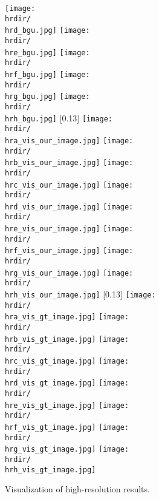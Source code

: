 \documentclass[runningheads]{llncs}
\begin{document}
\begin{figure*}[hthb]
{\texttt{[image: \\hrdir/\\hrd\_bgu.jpg]}
\texttt{[image: \\hrdir/\\hre\_bgu.jpg]}
\texttt{[image: \\hrdir/\\hrf\_bgu.jpg]}
\texttt{[image: \\hrdir/\\hrg\_bgu.jpg]}
\texttt{[image: \\hrdir/\\hrh\_bgu.jpg]}
}
[0.13\linewidth]
{
\texttt{[image: \\hrdir/\\hra\_vis\_our\_image.jpg]}
\texttt{[image: \\hrdir/\\hrb\_vis\_our\_image.jpg]}
\texttt{[image: \\hrdir/\\hrc\_vis\_our\_image.jpg]}
\texttt{[image: \\hrdir/\\hrd\_vis\_our\_image.jpg]}
\texttt{[image: \\hrdir/\\hre\_vis\_our\_image.jpg]}
\texttt{[image: \\hrdir/\\hrf\_vis\_our\_image.jpg]}
\texttt{[image: \\hrdir/\\hrg\_vis\_our\_image.jpg]}
\texttt{[image: \\hrdir/\\hrh\_vis\_our\_image.jpg]}
}
[0.13\linewidth]
{
\texttt{[image: \\hrdir/\\hra\_vis\_gt\_image.jpg]}
\texttt{[image: \\hrdir/\\hrb\_vis\_gt\_image.jpg]}
\texttt{[image: \\hrdir/\\hrc\_vis\_gt\_image.jpg]}
\texttt{[image: \\hrdir/\\hrd\_vis\_gt\_image.jpg]}
\texttt{[image: \\hrdir/\\hre\_vis\_gt\_image.jpg]}
\texttt{[image: \\hrdir/\\hrf\_vis\_gt\_image.jpg]}
\texttt{[image: \\hrdir/\\hrg\_vis\_gt\_image.jpg]}
\texttt{[image: \\hrdir/\\hrh\_vis\_gt\_image.jpg]}
}
\caption{Visualization of high-resolution results. }

\label{fig:HR_vis_supp}
\end{figure*}
\end{document}
